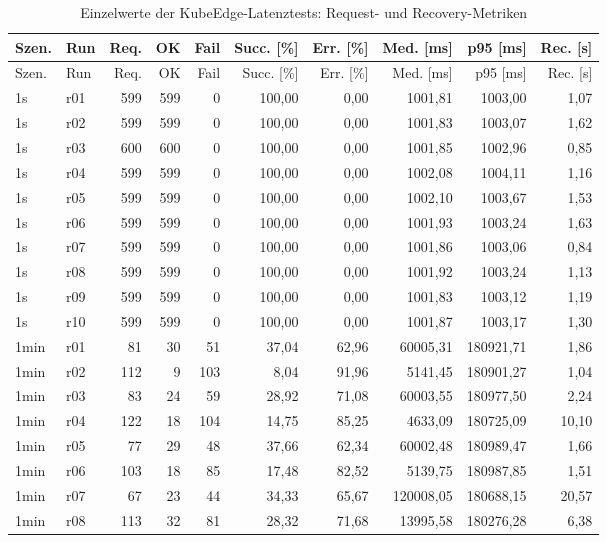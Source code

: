 \begin{longtable}{llrrrrrrrr}
\caption{Einzelwerte der KubeEdge-Latenztests: Request- und Recovery-Metriken}\label{tab:appendix-kubeedge-latency-requests}\\
\toprule
Szen. & Run & Req. & OK & Fail & Succ. [\%] & Err. [\%] & Med. [ms] & p95 [ms] & Rec. [s] \\
\midrule
\endfirsthead
\toprule
Szen. & Run & Req. & OK & Fail & Succ. [\%] & Err. [\%] & Med. [ms] & p95 [ms] & Rec. [s] \\
\midrule
\endhead
1s & r01 & 599 & 599 & 0 & 100,00 & 0,00 & 1001,81 & 1003,00 & 1,07 \\
1s & r02 & 599 & 599 & 0 & 100,00 & 0,00 & 1001,83 & 1003,07 & 1,62 \\
1s & r03 & 600 & 600 & 0 & 100,00 & 0,00 & 1001,85 & 1002,96 & 0,85 \\
1s & r04 & 599 & 599 & 0 & 100,00 & 0,00 & 1002,08 & 1004,11 & 1,16 \\
1s & r05 & 599 & 599 & 0 & 100,00 & 0,00 & 1002,10 & 1003,67 & 1,53 \\
1s & r06 & 599 & 599 & 0 & 100,00 & 0,00 & 1001,93 & 1003,24 & 1,63 \\
1s & r07 & 599 & 599 & 0 & 100,00 & 0,00 & 1001,86 & 1003,06 & 0,84 \\
1s & r08 & 599 & 599 & 0 & 100,00 & 0,00 & 1001,92 & 1003,24 & 1,13 \\
1s & r09 & 599 & 599 & 0 & 100,00 & 0,00 & 1001,83 & 1003,12 & 1,19 \\
1s & r10 & 599 & 599 & 0 & 100,00 & 0,00 & 1001,87 & 1003,17 & 1,30 \\
1min & r01 & 81 & 30 & 51 & 37,04 & 62,96 & 60005,31 & 180921,71 & 1,86 \\
1min & r02 & 112 & 9 & 103 & 8,04 & 91,96 & 5141,45 & 180901,27 & 1,04 \\
1min & r03 & 83 & 24 & 59 & 28,92 & 71,08 & 60003,55 & 180977,50 & 2,24 \\
1min & r04 & 122 & 18 & 104 & 14,75 & 85,25 & 4633,09 & 180725,09 & 10,10 \\
1min & r05 & 77 & 29 & 48 & 37,66 & 62,34 & 60002,48 & 180989,47 & 1,66 \\
1min & r06 & 103 & 18 & 85 & 17,48 & 82,52 & 5139,75 & 180987,85 & 1,51 \\
1min & r07 & 67 & 23 & 44 & 34,33 & 65,67 & 120008,05 & 180688,15 & 20,57 \\
1min & r08 & 113 & 32 & 81 & 28,32 & 71,68 & 13995,58 & 180276,28 & 6,38 \\

\end{longtable}
